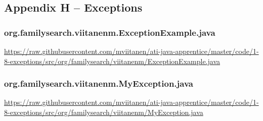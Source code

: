 \subsection*{Appendix H -- Exceptions} \label{App:AppendixH}

\subsubsection*{org.familysearch.viitanenm.ExceptionExample.java}\label{App:AppendixHExample}
\noindent
\begin{minipage}{.6in}
\end{minipage}
\begin{minipage}{6in}
  \url{https://raw.githubusercontent.com/mviitanen/ati-java-apprentice/master/code/1-8-exceptions/src/org/familysearch/viitanenm/ExceptionExample.java}
\end{minipage}

\vspace{1em}
\subsubsection*{org.familysearch.viitanenm.MyException.java}\label{App:AppendixHExeption}
\noindent
\begin{minipage}{.6in}
\end{minipage}
\begin{minipage}{6in}
  \url{https://raw.githubusercontent.com/mviitanen/ati-java-apprentice/master/code/1-8-exceptions/src/org/familysearch/viitanenm/MyException.java}
\end{minipage}
